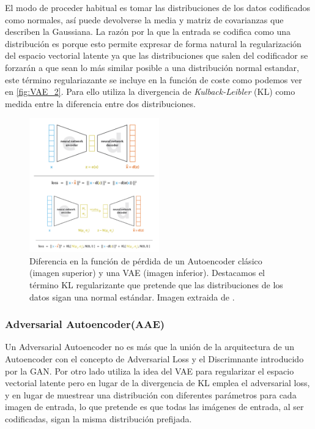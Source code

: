             \noindent El modo de proceder habitual es tomar las distribuciones de los datos codificados como normales, así puede devolverse la media y matriz de covarianzas que describen la Gaussiana. La razón por la que la entrada se codifica como una distribución es porque esto permite expresar de forma natural la regularización del espacio vectorial latente ya que las distribuciones que salen del codificador se forzarán a que sean lo más similar posible a una distribución normal estandar, este término regulariazante se incluye en la función de coste como podemos ver en \autoref{fig:VAE_2}. Para ello utiliza la divergencia de \textit{Kulback-Leibler} (KL) como medida entre la diferencia entre dos distribuciones.

            \begin{figure}[!h]
                \centering
                \includegraphics[width=0.5\textwidth]{img/vae_2.png}
                \caption{Diferencia en la función de pérdida de un Autoencoder clásico (imagen superior) y una VAE (imagen inferior). Destacamos el término KL regularizante que pretende que las distribuciones de los datos sigan una normal estándar. Imagen extraida de \cite{VAE}.}
                \label{fig:VAE_2}
            \end{figure}
        
        \subsubsection{Adversarial Autoencoder(AAE)}
            \noindent Un Adversarial Autoencoder no es más que la unión de la arquitectura de un Autoencoder con el concepto de Adversarial Loss y el Discrimnante introducido por la GAN. Por otro lado utiliza la idea del VAE para regularizar el espacio vectorial latente pero en lugar de la divergencia de KL emplea el adversarial loss, y en lugar de muestrear una distribución con diferentes parámetros para cada imagen de entrada, lo que pretende es que todas las imágenes de entrada, al ser codificadas, sigan la misma distribución prefijada.

